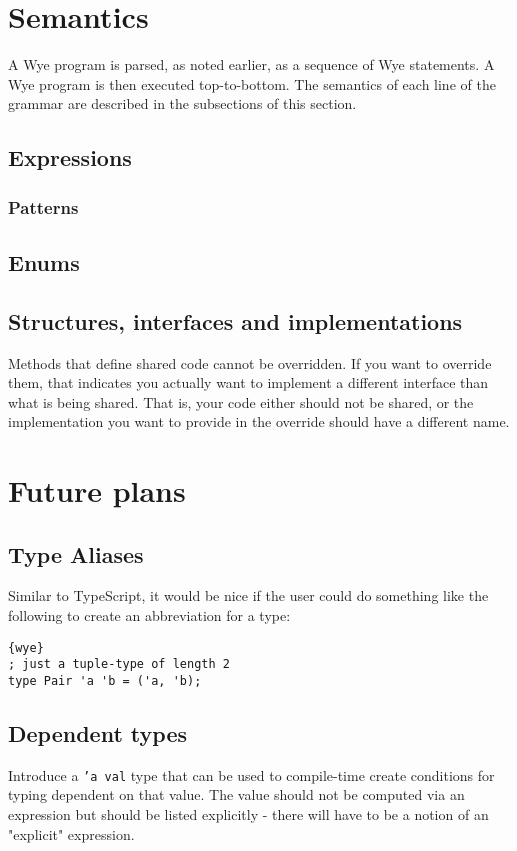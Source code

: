 \documentclass[a4paper, 12pt]{article}
\begin{document}
\section{Semantics}

A Wye program is parsed, as noted earlier, as a sequence of Wye statements. A Wye
program is then executed top-to-bottom. The semantics of each line of the grammar are
described in the subsections of this section.

\subsection{Expressions}

\subsubsection{Patterns}

\subsection{Enums}

\subsection{Structures, interfaces and implementations}

Methods that define shared code cannot be overridden. If you want to override them, that indicates you
actually want to implement a different interface than what is being shared. That is, your code either
should not be shared, or the implementation you want to provide in the override should have a
different name.

\section{Future plans}

\subsection{Type Aliases}
Similar to TypeScript, it would be nice if the user could do something like the
following to create an abbreviation for a type:
\begin{lstlisting}{wye}
; just a tuple-type of length 2
type Pair 'a 'b = ('a, 'b);
\end{lstlisting}

\subsection{Dependent types}
Introduce a \texttt{'a val} type that can be used to compile-time create conditions
for typing dependent on that value. The value should not be computed via an expression
but should be listed explicitly - there will have to be a notion of an "explicit" expression.
\end{document}
